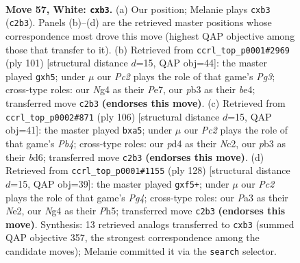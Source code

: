 \documentclass[11pt]{article}
\begin{document}
\clearpage

\begin{figure}[p]\centering
\begin{subfigure}{0.46\textwidth}\centering
\resizebox{\linewidth}{!}{%
\newchessgame
\chessboard[
  setfen={8/kb6/8/6n1/3p2N1/Pp4P1/2P5/1K6 w - - 0 57},
  showmover=false,
  pgfstyle=straightmove, color=movearrow, markmove={c2-b3}
]}
\caption{}
\end{subfigure}\hfill
\begin{subfigure}{0.46\textwidth}\centering
\resizebox{\linewidth}{!}{%
\newchessgame
\chessboard[
  setfen={8/4p1k1/6p1/4p2P/1p2B3/7P/8/6K1 b - - 0 51},
  showmover=false,
  pgfstyle=straightmove, color=movearrow, markmove={g6-h5}
]}
\caption{}
\end{subfigure}
\\[4pt]
\begin{subfigure}{0.46\textwidth}\centering
\resizebox{\linewidth}{!}{%
\newchessgame
\chessboard[
  setfen={8/3k3p/3b4/p2p3P/1P6/5K2/2N5/8 w - - 0 54},
  showmover=false,
  pgfstyle=straightmove, color=movearrow, markmove={b4-a5}
]}
\caption{}
\end{subfigure}\hfill
\begin{subfigure}{0.46\textwidth}\centering
\resizebox{\linewidth}{!}{%
\newchessgame
\chessboard[
  setfen={8/8/4k2p/4bp1P/6P1/4K3/4N3/8 w - - 0 65},
  showmover=false,
  pgfstyle=straightmove, color=movearrow, markmove={g4-f5}
]}
\caption{}
\end{subfigure}
\caption{\textbf{Move 57, White: \texttt{cxb3}.} (a) Our position; Melanie plays \texttt{cxb3} (\texttt{c2b3}). Panels (b)--(d) are the retrieved master positions whose correspondence most drove this move (highest QAP objective among those that transfer to it). (b) Retrieved from \texttt{ccrl\_top\_p0001\#2969} (ply 101) [structural distance $d$=15, QAP obj=44]: the master played \texttt{gxh5}; under $\mu$ our \emph{Pc2} plays the role of that game's \emph{Pg3}; cross-type roles: our \emph{N}g4 as their \emph{P}e7, our \emph{p}b3 as their \emph{b}e4; transferred move \texttt{c2b3} \textbf{(endorses this move)}. (c) Retrieved from \texttt{ccrl\_top\_p0002\#871} (ply 106) [structural distance $d$=15, QAP obj=41]: the master played \texttt{bxa5}; under $\mu$ our \emph{Pc2} plays the role of that game's \emph{Pb4}; cross-type roles: our \emph{p}d4 as their \emph{N}c2, our \emph{p}b3 as their \emph{b}d6; transferred move \texttt{c2b3} \textbf{(endorses this move)}. (d) Retrieved from \texttt{ccrl\_top\_p0001\#1155} (ply 128) [structural distance $d$=15, QAP obj=39]: the master played \texttt{gxf5+}; under $\mu$ our \emph{Pc2} plays the role of that game's \emph{Pg4}; cross-type roles: our \emph{P}a3 as their \emph{N}e2, our \emph{N}g4 as their \emph{P}h5; transferred move \texttt{c2b3} \textbf{(endorses this move)}. Synthesis: 13 retrieved analogs transferred to \texttt{cxb3} (summed QAP objective 357, the strongest correspondence among the candidate moves); Melanie committed it via the \texttt{search} selector.}
\label{fig:thought-m112}
\end{figure}
\end{document}

